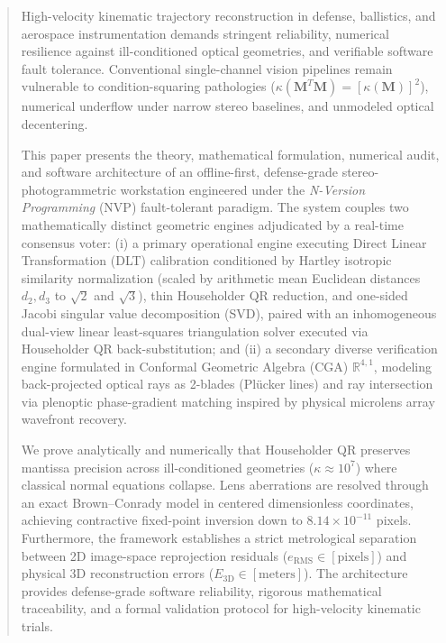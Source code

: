 \documentclass[journal]{IEEEtran}
\begin{document}
\begin{abstract}
High-velocity kinematic trajectory reconstruction in defense, ballistics, and aerospace instrumentation demands stringent reliability, numerical resilience against ill-conditioned optical geometries, and verifiable software fault tolerance. Conventional single-channel vision pipelines remain vulnerable to condition-squaring pathologies ($\kappa(\mathbf{M}^T\mathbf{M}) = [\kappa(\mathbf{M})]^2$), numerical underflow under narrow stereo baselines, and unmodeled optical decentering. 

This paper presents the theory, mathematical formulation, numerical audit, and software architecture of an offline-first, defense-grade stereo-photogrammetric workstation engineered under the \textit{N-Version Programming} (NVP) fault-tolerant paradigm. The system couples two mathematically distinct geometric engines adjudicated by a real-time consensus voter:
(i) a primary operational engine executing Direct Linear Transformation (DLT) calibration conditioned by Hartley isotropic similarity normalization (scaled by arithmetic mean Euclidean distances $d_2, d_3$ to $\sqrt{2}$ and $\sqrt{3}$), thin Householder QR reduction, and one-sided Jacobi singular value decomposition (SVD), paired with an inhomogeneous dual-view linear least-squares triangulation solver executed via Householder QR back-substitution; and 
(ii) a secondary diverse verification engine formulated in Conformal Geometric Algebra (CGA) $\mathbb{R}^{4,1}$, modeling back-projected optical rays as 2-blades (Plücker lines) and ray intersection via plenoptic phase-gradient matching inspired by physical microlens array wavefront recovery. 

We prove analytically and numerically that Householder QR preserves mantissa precision across ill-conditioned geometries ($\kappa \approx 10^7$) where classical normal equations collapse. Lens aberrations are resolved through an exact Brown--Conrady model in centered dimensionless coordinates, achieving contractive fixed-point inversion down to $8.14 \times 10^{-11}$ pixels. Furthermore, the framework establishes a strict metrological separation between 2D image-space reprojection residuals ($e_{\mathrm{RMS}} \in [\text{pixels}]$) and physical 3D reconstruction errors ($E_{\mathrm{3D}} \in [\text{meters}]$). The architecture provides defense-grade software reliability, rigorous mathematical traceability, and a formal validation protocol for high-velocity kinematic trials.
\end{abstract}
\end{document}
